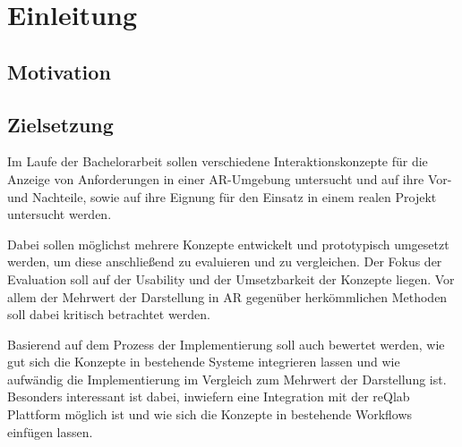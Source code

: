 \chapter{Einleitung}

\section{Motivation}

\section{Zielsetzung}

Im Laufe der Bachelorarbeit sollen verschiedene Interaktionskonzepte für die Anzeige von Anforderungen in einer AR-Umgebung untersucht und auf ihre Vor- und Nachteile, sowie auf ihre Eignung für den Einsatz in einem realen Projekt untersucht werden.

Dabei sollen möglichst mehrere Konzepte entwickelt und prototypisch umgesetzt werden, um diese anschließend zu evaluieren und zu vergleichen.
Der Fokus der Evaluation soll auf der Usability und der Umsetzbarkeit der Konzepte liegen.
Vor allem der Mehrwert der Darstellung in AR gegenüber herkömmlichen Methoden soll dabei kritisch betrachtet werden.

Basierend auf dem Prozess der Implementierung soll auch bewertet werden, wie gut sich die Konzepte in bestehende Systeme integrieren lassen und wie aufwändig die Implementierung im Vergleich zum Mehrwert der Darstellung ist.
Besonders interessant ist dabei, inwiefern eine Integration mit der reQlab Plattform möglich ist und wie sich die Konzepte in bestehende Workflows einfügen lassen.